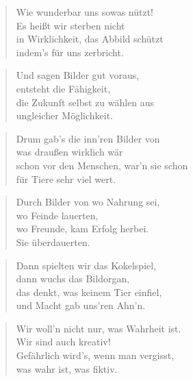 \documentclass[10pt,a4paper]{article}
\begin{document}
\begin{multicols}{2}
\begin{verse}
Wie wunderbar uns sowas nützt! \\
Es heißt wir sterben nicht \\
in Wirklichkeit, das Abbild schützt \\
indem’s für uns zerbricht. \\
\end{verse}

\begin{verse}
Und sagen Bilder gut voraus, \\
entsteht die Fähigkeit, \\
die Zukunft selbst zu wählen aus \\
ungleicher Möglichkeit. \\
\end{verse}

\begin{verse}
Drum gab’s die inn’ren Bilder von \\
was draußen wirklich wär \\
schon vor den Menschen, war’n sie schon \\
für Tiere sehr viel wert. \\
\end{verse}

\begin{verse}
Durch Bilder von wo Nahrung sei, \\
wo Feinde lauerten, \\
wo Freunde, kam Erfolg herbei. \\
Sie überdauerten. \\
\end{verse}

\begin{verse}
Dann spielten wir das Kokelspiel, \\
dann wuchs das Bildorgan, \\
das denkt, was keinem Tier einfiel, \\
und Macht gab uns’ren Ahn’n. \\
\end{verse}

\begin{verse}
Wir woll’n nicht nur, was Wahrheit ist. \\
Wir sind auch kreativ! \\
Gefährlich wird’s, wenn man vergisst, \\
was wahr ist, was fiktiv. \\
\end{verse}


\end{multicols}
\end{document}
